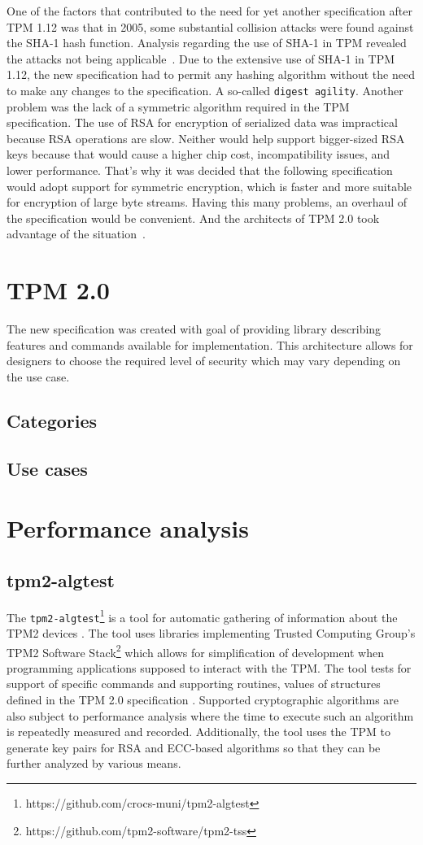 One of the factors that contributed to the need for yet another specification after TPM 1.12 was that in 2005, some substantial collision attacks were found against the SHA-1 hash function. Analysis regarding the use of SHA-1 in TPM revealed the attacks not being applicable~\cite{tcg_tpm1.12_sha-1_uses}. Due to the extensive use of SHA-1 in TPM 1.12, the new specification had to permit any hashing algorithm without the need to make any changes to the specification. A so-called \texttt{digest agility}. Another problem was the lack of a symmetric algorithm required in the TPM specification. The use of RSA for encryption of serialized data was impractical because RSA operations are slow. Neither would help support bigger-sized RSA keys because that would cause a higher chip cost, incompatibility issues, and lower performance. That's why it was decided that the following specification would adopt support for symmetric encryption, which is faster and more suitable for encryption of large byte streams. Having this many problems, an overhaul of the specification would be convenient. And the architects of TPM 2.0 took advantage of the situation~\cite{arthur2015practical}.

\section{TPM 2.0}
The new specification was created with goal of providing library describing features and commands available for implementation. This architecture allows for designers to choose the required level of security which may vary depending on the use case. 

\subsection{Categories}
\subsection{Use cases}


\section{Performance analysis}
\subsection{tpm2-algtest}
The \texttt{tpm2-algtest}\footnote{https://github.com/crocs-muni/tpm2-algtest} is a tool for automatic gathering of information about the TPM2 devices \cite{Struk2019thesis}. The tool uses libraries implementing Trusted Computing Group's TPM2 Software Stack\footnote{https://github.com/tpm2-software/tpm2-tss} which allows for simplification of development when programming applications supposed to interact with the TPM. The tool tests for support of specific commands and supporting routines, values of structures defined in the TPM 2.0 specification \cite{tcg_p3_commands, tcg_p4_supproutines, tcg_p2_structures}. Supported cryptographic algorithms are also subject to performance analysis where the time to execute such an algorithm is repeatedly measured and recorded. Additionally, the tool uses the TPM to generate key pairs for RSA and ECC-based algorithms so that they can be further analyzed by various means.
